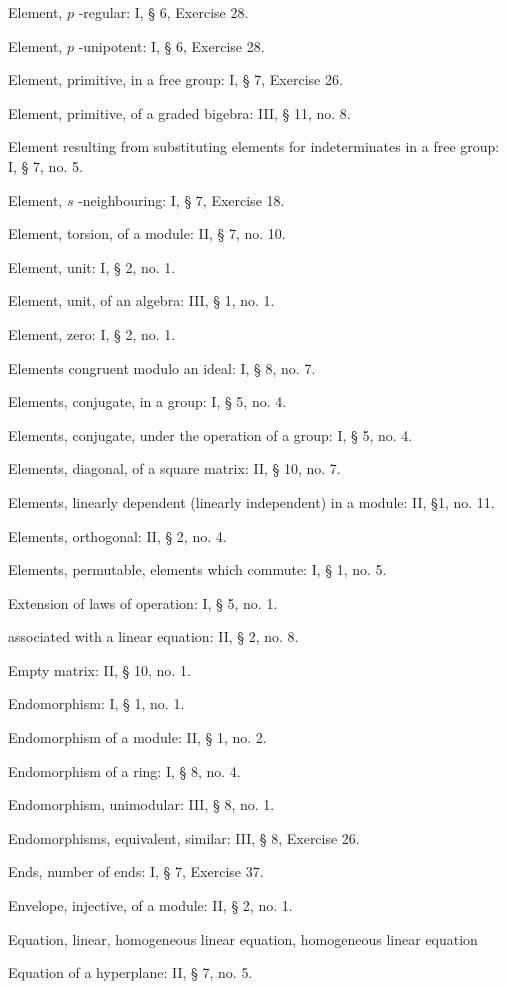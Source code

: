Element, \(p\) -regular: I, § 6, Exercise 28.

Element, \(p\) -unipotent: I, § 6, Exercise 28.

Element, primitive, in a free group: I, § 7, Exercise 26.

Element, primitive, of a graded bigebra: III, § 11, no. 8.

Element resulting from substituting elements for indeterminates in a free group: I, § 7, no. 5.

Element, \(s\) -neighbouring: I, § 7, Exercise 18.

Element, torsion, of a module: II, § 7, no. 10.

Element, unit: I, § 2, no. 1.

Element, unit, of an algebra: III, § 1, no. 1.

Element, zero: I, § 2, no. 1.

Elements congruent modulo an ideal: I, § 8, no. 7.

Elements, conjugate, in a group: I, § 5, no. 4.

Elements, conjugate, under the operation of a group: I, § 5, no. 4.

Elements, diagonal, of a square matrix: II, § 10, no. 7.

Elements, linearly dependent (linearly independent) in a module: II, §1, no. 11.

Elements, orthogonal: II, § 2, no. 4.

Elements, permutable, elements which commute: I, § 1, no. 5.

Extension of laws of operation: I, § 5, no. 1.

associated with a linear equation: II, § 2, no. 8.

Empty matrix: II, § 10, no. 1.

Endomorphism: I, § 1, no. 1.

Endomorphism of a module: II, § 1, no. 2.

Endomorphism of a ring: I, § 8, no. 4.

Endomorphism, unimodular: III, § 8, no. 1.

Endomorphisms, equivalent, similar: III, § 8, Exercise 26.

Ends, number of ends: I, § 7, Exercise 37.

Envelope, injective, of a module: II, § 2, no. 1.

Equation, linear, homogeneous linear equation, homogeneous linear equation

Equation of a hyperplane: II, § 7, no. 5.

